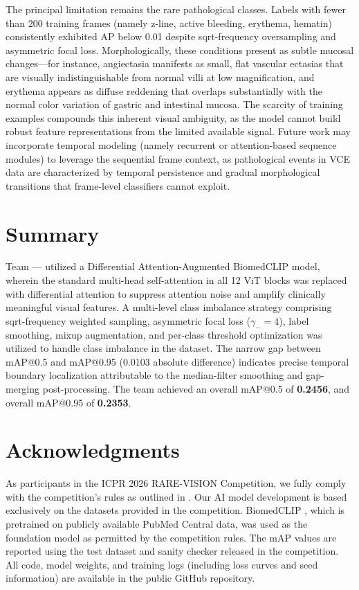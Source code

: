 \documentclass[12pt]{article}
\begin{document}
The principal limitation remains the rare pathological classes. Labels with fewer than 200 training frames (namely z-line, active bleeding, erythema, hematin) consistently exhibited AP below 0.01 despite sqrt-frequency oversampling and asymmetric focal loss. Morphologically, these conditions present as subtle mucosal changes—for instance, angiectasia manifests as small, flat vascular ectasias that are visually indistinguishable from normal villi at low magnification, and erythema appears as diffuse reddening that overlaps substantially with the normal color variation of gastric and intestinal mucosa. The scarcity of training examples compounds this inherent visual ambiguity, as the model cannot build robust feature representations from the limited available signal. Future work may incorporate temporal modeling (namely recurrent or attention-based sequence modules) to leverage the sequential frame context, as pathological events in VCE data are characterized by temporal persistence and gradual morphological transitions that frame-level classifiers cannot exploit.


\section{Summary}\label{sec5}

Team --- utilized a Differential Attention-Augmented BiomedCLIP model, wherein the standard multi-head self-attention in all 12 ViT blocks was replaced with differential attention to suppress attention noise and amplify clinically meaningful visual features. A multi-level class imbalance strategy comprising sqrt-frequency weighted sampling, asymmetric focal loss ($\gamma_- = 4$), label smoothing, mixup augmentation, and per-class threshold optimization was utilized to handle class imbalance in the dataset. The narrow gap between mAP@0.5 and mAP@0.95 (0.0103 absolute difference) indicates precise temporal boundary localization attributable to the median-filter smoothing and gap-merging post-processing. The team achieved an overall mAP@0.5 of \textbf{0.2456}, and overall mAP@0.95 of \textbf{0.2353}.

\section{Acknowledgments}\label{sec6}

As participants in the ICPR 2026 RARE-VISION Competition, we fully comply with the competition's rules as outlined in \cite{Lawniczak2025}. Our AI model development is based exclusively on the datasets provided in the competition. BiomedCLIP \cite{Zhang2023biomedclip}, which is pretrained on publicly available PubMed Central data, was used as the foundation model as permitted by the competition rules. The mAP values are reported using the test dataset and sanity checker released in the competition. All code, model weights, and training logs (including loss curves and seed information) are available in the public GitHub repository.



\end{document}
